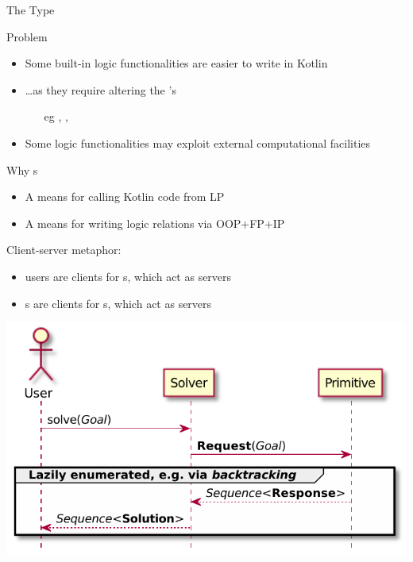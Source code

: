 \documentclass[handout]{beamer}
\begin{document}
\begin{frame}[allowframebreaks]{The  Type}

    \begin{alertblock}{Problem}
        \begin{itemize}
            \item Some built-in logic functionalities are easier to write in Kotlin
            \item \ldots as they require \alert{altering} the 's 
            \begin{itemize}
                \item[eg] , , 
            \end{itemize}
            \item Some logic functionalities may exploit external computational facilities
        \end{itemize}
    \end{alertblock}

    \begin{block}{Why s}
        \begin{itemize}
            \item A means for calling Kotlin code from LP
            \item A means for writing logic \alert{relations} via OOP+FP+IP
        \end{itemize}
    \end{block}

    \framebreak

    Client-server metaphor:
    \begin{itemize}
        \item users are clients for s, which act as servers
        \item {}s are clients for s, which act as servers
    \end{itemize}

    \smallskip

    \begin{center}
        \includegraphics[width=.5\linewidth]{img/primitive-usage.pdf}
    \end{center}


\end{frame}
\end{document}
